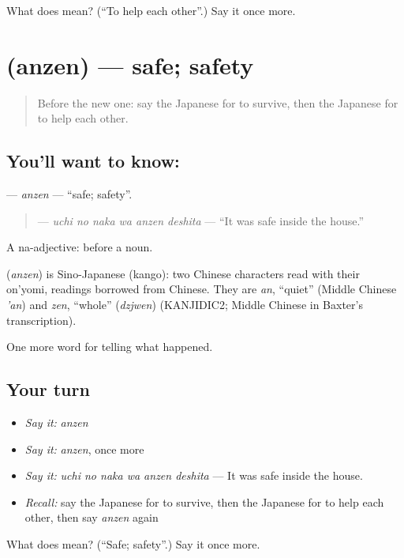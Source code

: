 \begin{tcolorbox}[breakable,colback=teal!4,colframe=teal!35!black,title={Before you move on}]
What does  mean? (\textquotedblleft{}To help each other\textquotedblright{}.) Say it once more.
\end{tcolorbox}
\section[\texorpdfstring{\ja{あんぜん} (anzen)}{あんぜん (anzen)}]{ (anzen) — safe; safety}

\label{lesson:JA-C268-anzen}



\begin{quote}
Before the new one: say the Japanese for to survive, then the Japanese for to help each other.
\end{quote}

\subsection*{You'll want to know: }
\textbf{} — \emph{anzen} — \textquotedblleft{}safe; safety\textquotedblright{}.

\begin{quote}
\textbf{  } — \emph{uchi no naka wa anzen deshita} — \textquotedblleft{}It was safe inside the house.\textquotedblright{}
\end{quote}

A na-adjective:  before a noun.

\begin{cousinweb}
\textbf{} (\emph{anzen}) is Sino-Japanese (kango): two Chinese characters read with their on'yomi, readings borrowed from Chinese. They are \emph{an}, \textquotedblleft{}quiet\textquotedblright{} (Middle Chinese \emph{'an}) and \emph{zen}, \textquotedblleft{}whole\textquotedblright{} (\emph{dzjwen}) (KANJIDIC2; Middle Chinese in Baxter's transcription).
\end{cousinweb}

\begin{grammarlens}[title={What you've built}]
One more word for telling what happened.
\end{grammarlens}

\subsection*{Your turn}
\begin{itemize}
\raggedright
  \item \emph{Say it:} \emph{anzen}
  \item \emph{Say it:} \emph{anzen}, once more
  \item \emph{Say it:} \emph{uchi no naka wa anzen deshita} — It was safe inside the house.
  \item \emph{Recall:} say the Japanese for to survive, then the Japanese for to help each other, then say \emph{anzen} again
\end{itemize}

\begin{tcolorbox}[breakable,colback=teal!4,colframe=teal!35!black,title={Before you move on}]
What does  mean? (\textquotedblleft{}Safe; safety\textquotedblright{}.) Say it once more.
\end{tcolorbox}

